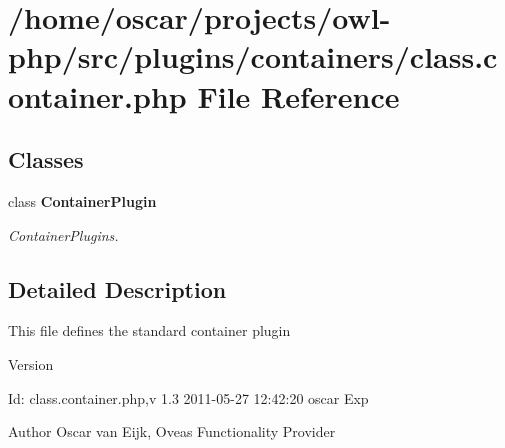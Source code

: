 \section{/home/oscar/projects/owl-\/php/src/plugins/containers/class.container.php File Reference}
\label{plugins_2containers_2class_8container_8php}
\subsection*{Classes}
\begin{DoxyCompactItemize}
\item 
class {\bf ContainerPlugin}
\begin{DoxyCompactList}\small\item\em ContainerPlugins. \end{DoxyCompactList}\end{DoxyCompactItemize}


\subsection{Detailed Description}
This file defines the standard container plugin \begin{DoxyVersion}{Version}

\end{DoxyVersion}
\begin{DoxyParagraph}{Id:}
class.container.php,v 1.3 2011-\/05-\/27 12:42:20 oscar Exp 
\end{DoxyParagraph}
\begin{DoxyAuthor}{Author}
Oscar van Eijk, Oveas Functionality Provider 
\end{DoxyAuthor}
